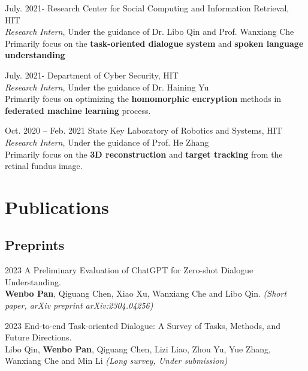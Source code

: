 \documentclass[11pt,letterpaper]{report}
\begin{document}
\begin{tablist}

\item[July. 2021-] \tab{}Research Center for Social Computing and Information Retrieval, HIT \\
\textit{Research Intern}, Under the guidance of Dr. Libo Qin and Prof. Wanxiang Che \\
Primarily focus on the \textbf{task-oriented dialogue system} and \textbf{spoken language understanding}\\

\item[July. 2021-] \tab{} Department of Cyber Security, HIT \\
\textit{Research Intern}, Under the guidance of Dr. Haining Yu \\
Primarily focus on optimizing the \textbf{homomorphic encryption} methods in \textbf{federated machine learning} process. \\

\item[Oct. 2020 -- Feb. 2021] \tab{} State Key Laboratory of Robotics and Systems, HIT \\
\textit{Research Intern}, Under the guidance of Prof. He Zhang \\ 
Primarily focus on the \textbf{3D reconstruction} and \textbf{target tracking} from the retinal fundus image. \\

\end{tablist}


\section*{Publications}

\subsection*{Preprints}

\begin{tablist}


\item[2023] \tab{}A Preliminary Evaluation of ChatGPT for Zero-shot Dialogue Understanding. \\ \textbf{Wenbo Pan}, Qiguang Chen, Xiao Xu, Wanxiang Che and Libo Qin. \textit{(Short paper, arXiv preprint arXiv:2304.04256)}\\

\item[2023] \tab{}End-to-end Task-oriented Dialogue: A Survey of Tasks, Methods, and Future Directions. \\ Libo Qin, \textbf{Wenbo Pan}, Qiguang Chen, Lizi Liao, Zhou Yu, Yue Zhang, Wanxiang Che and Min Li \textit{(Long survey, Under submission)}\\

\end{tablist}
\end{document}
